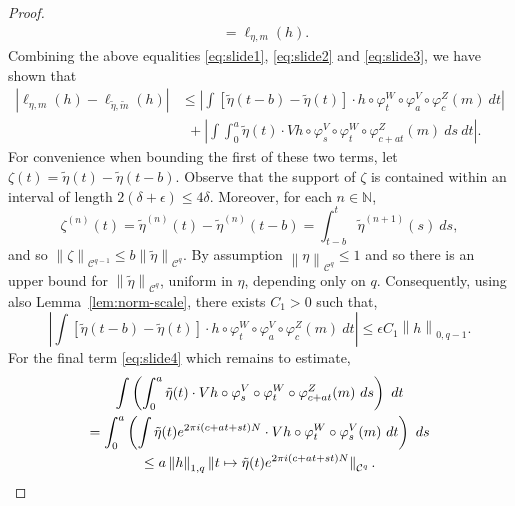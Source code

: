 \documentclass[a4paper,11pt]{amsart}
\theoremstyle{remark}
\newcommand{\abs}[1]{\left|#1\right|} %
\newcommand{\cC}{\mathcal{C}} %
\newcommand{\bN}{\mathbb{N}} %
\newcommand{\norm}[1]{\left\|#1\right\|} %
\newcommand{\dv}{V} %
\newcommand{\dw}{W} %
\newcommand{\dz}{Z} %
\begin{document}
\begin{proof}
\begin{equation}
\begin{aligned}
             & = \ell_{\eta,m}(h).
        \end{aligned}
    \end{equation}
    Combining the above equalities \eqref{eq:slide1}, \eqref{eq:slide2} and \eqref{eq:slide3}, we have shown that
    \begin{equation}
        \label{eq:slide4}
        \begin{aligned}
            \abs{\ell_{\eta,m}(h) - \ell_{\tilde{\eta},\tilde{m}}(h)}
             & \leq \abs{\int \left[\tilde{\eta}(t-b) - \tilde{\eta}(t)\right] \cdot h \circ \varphi_{t}^{\dw} \circ \varphi_a^\dv \circ \varphi_c^\dz (m) \ dt} \\
             & \ \ + \abs{\int \int_{0}^{a} \tilde{\eta}(t) \cdot \dv h \circ \varphi_{s}^{\dv} \circ \varphi_{t}^{\dw} \circ \varphi_{c+at}^\dz (m) \ ds \ dt}.
        \end{aligned}
    \end{equation}
    For convenience when bounding the first of these two terms, let \(\zeta(t) = \tilde{\eta}(t) - \tilde{\eta}(t-b)\).
    Observe that the support of \(\zeta\) is contained within an interval of length \(2(\delta + \epsilon) \leq 4\delta\).
    Moreover, for each $n\in \bN$,  
    \[\zeta^{(n)}(t) = \tilde{\eta}^{(n)}(t) - \tilde{\eta}^{(n)}(t-b) = \int_{t-b}^{t} \tilde{\eta}^{(n+1)}(s) \ ds,\] and so \(\norm{\zeta}_{\cC^{q-1}} \leq b \norm{\tilde{\eta}}_{\cC^{q}}\).
    By assumption \(\norm{\eta}_{\cC^q} \leq 1\) and so there is an upper bound for \(\norm{\tilde{\eta}}_{\cC^{q}}\), uniform in \(\eta\), depending only on \(q\).
    Consequently, using also Lemma~\ref{lem:norm-scale}, there exists \(C_1>0\) such that,
    \begin{equation}
        \label{eq:slide5}
        \abs{\int \left[\tilde{\eta}(t-b) - \tilde{\eta}(t)\right] \cdot h \circ \varphi_{t}^{\dw} \circ \varphi_a^\dv \circ \varphi_c^\dz (m) \ dt} 
        \leq \epsilon C_1 \norm{h}_{0,q-1}.
    \end{equation}
    For the final term  \eqref{eq:slide4} which remains to estimate, 
    \begin{multline*}
        \int \left( \int_{0}^{a} \tilde{\eta}(t) \cdot \dv h \circ \varphi_{s}^{\dv} \circ \varphi_{t}^{\dw} \circ \varphi_{c+at}^\dz (m) \ ds \right) \ dt \\
        = \int_{0}^{a} \left( \int \tilde{\eta}(t) e^{2\pi i (c + at + st)N} \cdot \dv h  \circ \varphi_{t}^{\dw} \circ \varphi_{s}^{\dv} (m) \ dt \right) \ ds \\
        \leq a \norm{h}_{1,{q}} \norm{\smash{t \mapsto  \tilde{\eta}(t) e^{2\pi i (c + at + st)N} }}_{\cC^{q}}.

\end{multline*}
\end{proof}
\end{document}
